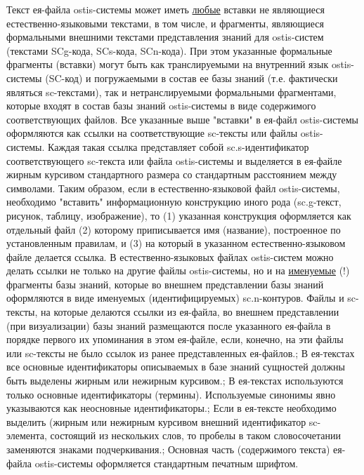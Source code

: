 \begin{SCn}
{Текст ея-файла ostis-системы может иметь \uline{любые} вставки не являющиеся естественно-языковыми текстами, в том числе, и фрагменты, являющиеся формальными внешними текстами представления знаний для ostis-систем (текстами SCg-кода, SCs-кода, SCn-кода). При этом указанные формальные фрагменты (вставки) могут быть как транслируемыми на внутренний язык ostis-системы (SC-код) и погружаемыми в состав ее базы знаний (т.е. фактически являться sc-текстами), так и нетранслируемыми формальными фрагментами, которые входят в состав базы знаний ostis-системы в виде содержимого соответствующих файлов. Все указанные выше "вставки" в ея-файл ostis-системы оформляются как ссылки на соответствующие sc-тексты или файлы ostis-системы. Каждая такая ссылка представляет собой sc.s-идентификатор соответствующего sc-текста или файла ostis-системы и выделяется в ея-файле жирным курсивом стандартного размера со стандартным расстоянием между символами.
Таким образом, если в естественно-языковой файл ostis-системы, необходимо "вставить" информационную конструкцию иного рода (sc.g-текст, рисунок, таблицу, изображение), то (1) указанная конструкция оформляется как отдельный файл (2) которому приписывается имя (название), построенное по установленным правилам, и (3) на который в указанном естественно-языковом файле делается ссылка.
В естественно-языковых файлах ostis-систем можно делать ссылки не только на другие файлы ostis-системы, но и на \uline{именуемые} (!) фрагменты базы знаний, которые во внешнем представлении базы знаний оформляются в виде именуемых (идентифицируемых) sc.n-контуров.
Файлы и sc-тексты, на которые делаются ссылки из ея-файла, во внешнем представлении (при визуализации) базы знаний размещаются после указанного ея-файла в порядке первого их упоминания в этом ея-файле, если, конечно, на эти файлы или sc-тексты не было ссылок из ранее представленных ея-файлов.;
В ея-текстах все основные идентификаторы описываемых в базе знаний сущностей должны быть выделены жирным или нежирным курсивом.;
В ея-текстах используются только основные идентификаторы (термины). Используемые синонимы явно указываются как неосновные идентификаторы.;
Если в ея-тексте необходимо выделить (жирным или нежирным курсивом внешний идентификатор sc-элемента, состоящий из нескольких слов, то пробелы в таком словосочетании заменяются знаками подчеркивания.;
Основная часть (содержимого текста) ея-файла ostis-системы оформляется стандартным печатным шрифтом.
}
\filemodefalse



\end{SCn}

